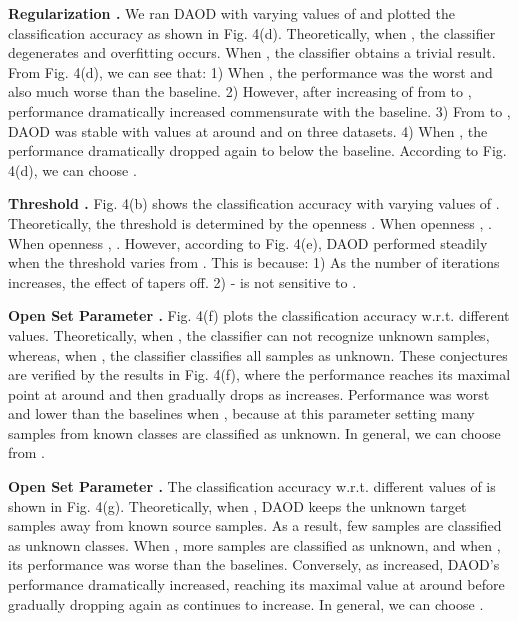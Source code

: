 \documentclass[journal]{IEEEtran}
\begin{document}
\textbf{{Regularization .}} We ran DAOD with varying values of  and plotted the
classification accuracy as shown in Fig. 4(d). Theoretically, when , the classifier
degenerates and overfitting occurs. When , the classifier obtains a trivial result. From Fig. 4(d),  we  can  see  that: 1) When ,  the  performance  was  the  worst  and  also  much worse than the baseline. 2) However, after increasing of  from  to , performance dramatically increased commensurate with the baseline. 3) From  to , DAOD was stable with values at around   and  on  three  datasets. 4) When , the performance dramatically dropped again to below the baseline. According to Fig. 4(d), we can choose .

\textbf{{Threshold .}} Fig. 4(b) shows the classification accuracy with varying values of . Theoretically, the threshold  is determined by the openness . When openness , . When  openness , . However, according to Fig. 4(e), DAOD performed steadily when the threshold  varies from . This is because: 1) As the number of iterations  increases, the effect of  tapers off. 2) - is not sensitive to .

{\textbf{Open Set Parameter .}} Fig. 4(f) plots the classification accuracy w.r.t. different values. Theoretically, when , the classifier can not recognize unknown samples, whereas, when , the classifier classifies all samples as unknown. These conjectures are verified by the results in Fig. 4(f), where the performance reaches its maximal point at around  and then gradually drops as  increases. Performance was worst and lower than the baselines when , because at this parameter setting many samples from known classes are classified as unknown. In general, we can choose  from .

{\textbf{Open Set Parameter .}} The classification accuracy w.r.t. different values of  is shown in Fig. 4(g). Theoretically, when , DAOD keeps the unknown target samples away from known source samples. As a result, few samples are classified as unknown classes. When , more samples are classified as unknown, and when , its performance was worse than the baselines. Conversely, as  increased, DAOD's performance dramatically increased, reaching its maximal value at around  before gradually dropping again as  continues to increase. In general, we can choose .

 
\end{document}
